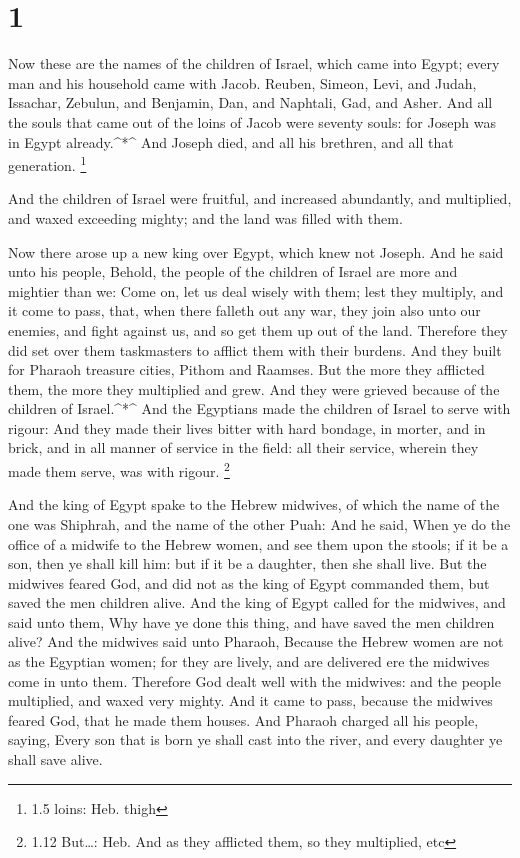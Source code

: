 \hypertarget{section}{%
\section{1}\label{section}}

 Now these are the names of the children of Israel, which
came into Egypt; every man and his household came with Jacob.
 Reuben, Simeon, Levi, and Judah,  Issachar,
Zebulun, and Benjamin,  Dan, and Naphtali, Gad, and Asher.
 And all the souls that came out of the loins of Jacob were
seventy souls: for Joseph was in Egypt already.\^{}*\^{} 
And Joseph died, and all his brethren, and all that generation.
\footnote{1.5 loins: Heb. thigh}

 And the children of Israel were fruitful, and increased
abundantly, and multiplied, and waxed exceeding mighty; and the land was
filled with them.

 Now there arose up a new king over Egypt, which knew not
Joseph.  And he said unto his people, Behold, the people of
the children of Israel are more and mightier than we:  Come
on, let us deal wisely with them; lest they multiply, and it come to
pass, that, when there falleth out any war, they join also unto our
enemies, and fight against us, and so get them up out of the land.
 Therefore they did set over them taskmasters to afflict
them with their burdens. And they built for Pharaoh treasure cities,
Pithom and Raamses.  But the more they afflicted them, the
more they multiplied and grew. And they were grieved because of the
children of Israel.\^{}*\^{}  And the Egyptians made the
children of Israel to serve with rigour:  And they made
their lives bitter with hard bondage, in morter, and in brick, and in
all manner of service in the field: all their service, wherein they made
them serve, was with rigour. \footnote{1.12 But\ldots: Heb. And as they
  afflicted them, so they multiplied, etc}

 And the king of Egypt spake to the Hebrew midwives, of
which the name of the one was Shiphrah, and the name of the other Puah:
 And he said, When ye do the office of a midwife to the
Hebrew women, and see them upon the stools; if it be a son, then ye
shall kill him: but if it be a daughter, then she shall live.
 But the midwives feared God, and did not as the king of
Egypt commanded them, but saved the men children alive. 
And the king of Egypt called for the midwives, and said unto them, Why
have ye done this thing, and have saved the men children alive?
 And the midwives said unto Pharaoh, Because the Hebrew
women are not as the Egyptian women; for they are lively, and are
delivered ere the midwives come in unto them.  Therefore
God dealt well with the midwives: and the people multiplied, and waxed
very mighty.  And it came to pass, because the midwives
feared God, that he made them houses.  And Pharaoh charged
all his people, saying, Every son that is born ye shall cast into the
river, and every daughter ye shall save alive.

